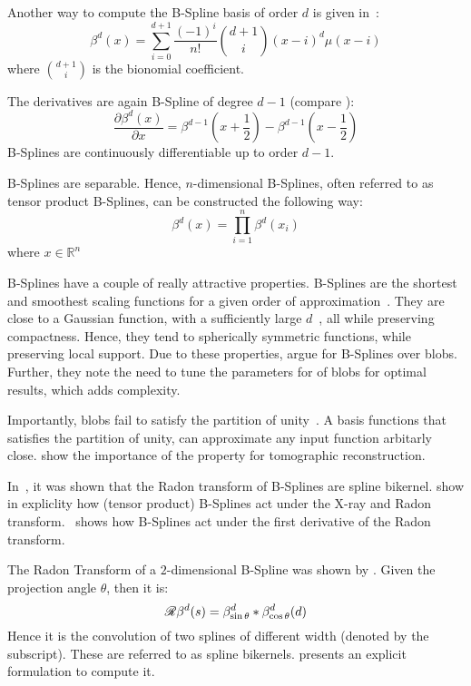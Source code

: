 Another way to compute the B-Spline basis of order \(d\) is given in~\cite{unser_fast_1991}:
\begin{equation}
	\beta^d(x) = \sum_{i=0}^{d+1} \frac{(-1)^i}{n!} \binom{d+1}{i}(x - i)^d\mu(x - i)
\end{equation}
where \(\binom{d+1}{i}\) is the bionomial coefficient.

The derivatives are again B-Spline of degree \(d-1\) (compare \cite{unser_splines_1999}):
\begin{equation}
	\frac{\partial \beta^d(x)}{\partial x} = \beta^{d-1}\left(x + \frac{1}{2}\right) -
	\beta^{d-1}\left(x - \frac{1}{2}\right)
\end{equation}
B-Splines are continuously differentiable up to order \(d-1\).

B-Splines are separable. Hence, \(n\)-dimensional B-Splines, often referred to as tensor product
B-Splines, can be constructed the following way:
\begin{equation}
	\beta^d(x) = \prod^n_{i=1} \beta^d(x_i)
\end{equation}
where \(x \in \mathbb{R}^n\)

B-Splines have a couple of really attractive properties. B-Splines are the shortest and smoothest
scaling functions for a given order of approximation~\cite{momey_b-spline_2012}. They are close to a
Gaussian function, with a sufficiently large $d$~\cite{momey_b-spline_2012}, all while preserving
compactness. Hence, they tend to spherically symmetric functions, while preserving local support.
Due to these properties, \citeauthor*{momey_new_2011}\cite{momey_new_2011} argue for B-Splines over
blobs. Further, they note the need to tune the parameters for of blobs for optimal results, which
adds complexity.

Importantly, blobs fail to satisfy the partition of unity~\cite{nilchian_fast_2013}. A basis
functions that satisfies the partition of unity, can approximate any input function arbitarly close.
\cite{nilchian_fast_2013} show the importance of the property for tomographic reconstruction.

In~\cite{horbelt_discretization_2002}, it was shown that the Radon transform of B-Splines are spline
bikernel. \citeauthor{entezari_box_2012} show in \cite{entezari_box_2012} expliclity how (tensor
product) B-Splines act under the X-ray and Radon transform.~\cite{nilchian_differential_2012} shows
how B-Splines act under the first derivative of the Radon transform.

The Radon Transform of a \(2\)-dimensional B-Spline was shown by
\citeauthor*{horbelt_discretization_2002}\cite{horbelt_discretization_2002}. Given the projection
angle \(\theta\), then it is:
\begin{equation}
	\mathscr{R}\beta^d(s) = \beta^d_{\sin\theta} * \beta^d_{\cos\theta}(d)
\end{equation}
Hence it is the convolution of two splines of different width (denoted by the subscript). These are
referred to as spline bikernels. \citeauthor*{horbelt_discretization_2002} presents an explicit
formulation to compute it.

